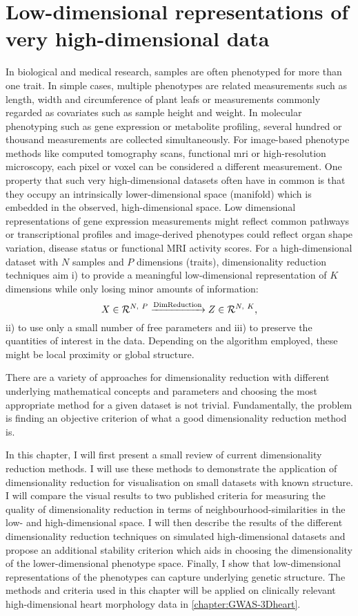 \chapter{Low-dimensional representations of very high-dimensional data}
\label{chapter:DimReduction}
In biological and medical research, samples are often phenotyped for more than one trait. In simple cases, multiple phenotypes are related measurements such as length, width and circumference of plant leafs or measurements commonly regarded as covariates such as sample height and weight. In molecular phenotyping such as gene expression or metabolite profiling, several hundred or thousand measurements are collected simultaneously.  For image-based phenotype methods like computed tomography scans, functional \gls{mri} or high-resolution microscopy, each pixel or voxel can be considered a different measurement. One property that such very high-dimensional datasets often have in common is that they occupy an intrinsically lower-dimensional space (manifold) which is embedded in the observed, high-dimensional space. Low dimensional representations of gene expression measurements might reflect common pathways or transcriptional profiles and image-derived phenotypes could reflect organ shape variation, disease status or functional MRI activity scores.  For a high-dimensional dataset  with \(N\) samples and \(P\) dimensions (traits), dimensionality reduction techniques aim i) to provide a meaningful low-dimensional representation  of \(K\) dimensions while only losing minor amounts of information:
\begin{equation}
X \in \mathcal{R}^{N,~P} \xrightarrow{\text{DimReduction}} Z \in \mathcal{R}^{N,~K} ,
\end{equation}
ii) to use only a small number of free parameters and iii) to preserve the quantities of interest in the data. Depending on the algorithm employed, these might be local proximity or global structure. 

There are a variety of approaches for dimensionality reduction with different underlying mathematical concepts and parameters and choosing the most appropriate method for a given dataset is not trivial. Fundamentally, the problem is finding an objective criterion of what a good dimensionality reduction method is. 

In this chapter, I will first present a small review of current dimensionality reduction methods. I will use these methods to demonstrate the application of dimensionality reduction for visualisation on small datasets with known structure. I will compare the visual results to two published criteria for measuring the quality of dimensionality reduction in terms of neighbourhood-similarities in the low- and high-dimensional space. I will then describe the results of the different dimensionality reduction techniques on simulated high-dimensional datasets and propose an additional stability criterion which aids in choosing the dimensionality of the lower-dimensional phenotype space. Finally, I show that low-dimensional representations of the phenotypes can capture underlying genetic structure. The methods and criteria used in this chapter will be applied on clinically relevant high-dimensional heart morphology data in \cref{chapter:GWAS-3Dheart}.

